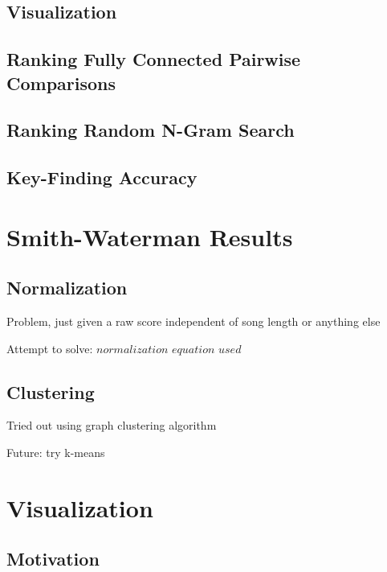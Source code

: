 \subsection{Visualization}

\subsection{Ranking Fully Connected Pairwise Comparisons}

\subsection{Ranking Random N-Gram Search}

\subsection{Key-Finding Accuracy}

\section{Smith-Waterman Results}

\subsection{Normalization}

\item Problem, just given a raw score independent of song length or anything else

\item Attempt to solve: $normalization$ $equation$ $used$

\subsection{Clustering}

\item Tried out using graph clustering algorithm

\item Future: try k-means

\section{Visualization}

\subsection{Motivation}

